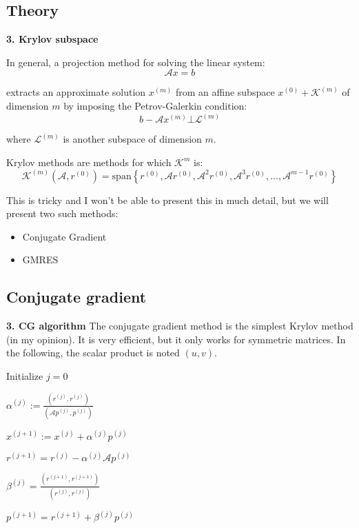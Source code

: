 \subsection{Theory}
\begin{frame}[fragile]{\textbf{3. Krylov subspace}}

In general, a projection method for solving the linear system:
\[
\mathcal{A}x = b
\]

extracts an approximate solution $x^{(m)}$ from an affine subspace $x^{(0)}+\mathcal{K}^{(m)}$ of dimension $m$ by imposing the Petrov-Galerkin condition:
\[
b - \mathcal{A}x^{(m)} \bot \mathcal{L}^{(m)}
\]


where $\mathcal{L}^{(m)}$ is another subspace of dimension $m$.


Krylov methods are methods for which $\mathcal{K}^m$ is:
\[
\mathcal{K}^{(m)} (\mathcal{A},r^{(0)}) = \mathrm{span} \left\{ r^{(0)}, \mathcal{A}r^{(0)}, \mathcal{A}^2r^{(0)}, \mathcal{A}^{3}r^{(0)}, ... , \mathcal{A}^{m-1}r^{(0)}\right\}
\]

This is tricky and I won't be able to present this in much detail, but we will present two such methods:
\begin{itemize}
	\item Conjugate Gradient
	\item GMRES
\end{itemize}
\end{frame}

\subsection{Conjugate gradient }


\begin{frame}[fragile]{\textbf{3. CG algorithm}}
The conjugate gradient method is the simplest Krylov method (in my opinion). It is very efficient, but it only works for symmetric matrices. In the following, the scalar product is noted $(u,v)$.

\vspace{0.5cm}


  \begin{algorithm}[H]

	Initialize $j=0$
	
	{
		$\alpha^{(j)} := \frac{(r^{(j)},r^{(j)})}{(\mathcal{A}p^{(j)},p^{(j)})} $
		
		$x^{(j+1)} := x^{(j)} + \alpha^{(j)}p^{(j)}$
		
		$r^{(j+1)} = r^{(j)} - \alpha^{(j)} \mathcal{A}p^{(j)}$
		
		$\beta^{(j)} = \frac{(r^{(j+1)},r^{(j+1)})}{(r^{(j)},r^{(j)})}$
		
		$p^{(j+1)} = r^{(j+1)} + \beta^{(j)} p^{(j)}$
		
	}
\end{algorithm}
\end{frame}


